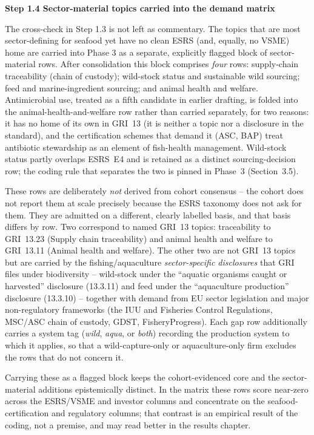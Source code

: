 \documentclass[
]{article}
\begin{document}
\textbf{Step 1.4 Sector-material topics carried into the demand matrix}

The cross-check in Step 1.3 is not left as commentary. The topics that
are most sector-defining for seafood yet have no clean ESRS (and,
equally, no VSME) home are carried into Phase 3 as a separate, explicitly
flagged block of sector-material rows. After consolidation this block
comprises \emph{four} rows: supply-chain traceability (chain of custody);
wild-stock status and sustainable wild sourcing; feed and
marine-ingredient sourcing; and animal health and welfare. Antimicrobial
use, treated as a fifth candidate in earlier drafting, is folded into the
animal-health-and-welfare row rather than carried separately, for two
reasons: it has no home of its own in GRI~13 (it is neither a topic nor a
disclosure in the standard), and the certification schemes that demand it
(ASC, BAP) treat antibiotic stewardship as an element of fish-health
management. Wild-stock status partly overlaps ESRS~E4 and is retained as a
distinct sourcing-decision row; the coding rule that separates the two is
pinned in Phase~3 (Section~3.5).

These rows are deliberately \emph{not} derived from cohort consensus --
the cohort does not report them at scale precisely because the ESRS
taxonomy does not ask for them. They are admitted on a different, clearly
labelled basis, and that basis differs by row. Two correspond to named
GRI~13 topics: traceability to GRI~13.23 (Supply chain traceability) and
animal health and welfare to GRI~13.11 (Animal health and welfare). The
other two are not GRI~13 topics but are carried by the
fishing/aquaculture \emph{sector-specific disclosures} that GRI files
under biodiversity -- wild-stock under the ``aquatic organisms caught or
harvested'' disclosure (13.3.11) and feed under the ``aquaculture
production'' disclosure (13.3.10) -- together with demand from EU sector
legislation and major non-regulatory frameworks (the IUU and Fisheries
Control Regulations, MSC/ASC chain of custody, GDST, FisheryProgress).
Each gap row additionally carries a system tag (\emph{wild},
\emph{aqua}, or \emph{both}) recording the production system to which it
applies, so that a wild-capture-only or aquaculture-only firm excludes
the rows that do not concern it.

Carrying these as a flagged block keeps the cohort-evidenced core and the
sector-material additions epistemically distinct. In the matrix
these rows score near-zero across the ESRS/VSME and investor columns and
concentrate on the seafood-certification and regulatory columns; that
contrast is an empirical result of the coding, not a premise, and may
read better in the results chapter.
\end{document}
